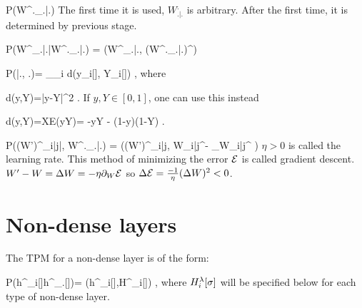 \beq\color{blue}
P(W^._{.|.})
\eeq
The first time it is used,
 $W^._{.|.}$ is arbitrary.
After the first time, it is determined
by previous stage.



\beq\color{blue}
P(W^\lam_{.|.}|W^._{.|.})
=
\delta(W^\lam_{.|.},
(W^._{.|.})^\lam)
\eeq

\beq\color{blue}
P(\cale|., .)=
\sum_\sigma\sum_i d(y_i[\sigma], Y_i[\sigma])
\;,
\eeq
where

\beq
d(y,Y)=|y-Y|^2
\;.
\eeq
If $y, Y\in [0,1]$,
one can use this instead

\beq
d(y,Y)=XE(y\rarrow Y)=
-y\ln Y - (1-y)\ln (1-Y)
\;.
\eeq

\beq\color{blue}
P((W')^\lam_{i|j}|\cale, W^._{.|.})
=
\delta((W')^\lam_{i|j},
W_{i|j}^\lam -\eta
\partial_{W_{i|j}^\lam} \cale
)
\eeq
$\eta>0$ is called the learning rate.
This method of minimizing the
error ${\cal E}$ is called
gradient descent.
$W'-W=\Delta W =-\eta  \partial_W {\cal E}$
so $\Delta {\cal E}=\frac{-1}{\eta}
(\Delta W)^2<0$.

\section{Non-dense layers}


The TPM for
a non-dense layer is of the
form:

\beq\color{blue}
P(h^\lam_i[\sigma]\mid h^{}_.[\sigma])=
\delta(h^\lam_i[\sigma],H^\lam_i[\sigma])
\;,
\eeq
where
$H^\lambda_i[\sigma]$ will
be specified below for each type of
non-dense layer.

